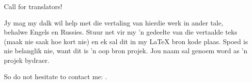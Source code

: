 \vspace*{\fill}

\Huge Call for translators!

\normalsize

\bigskip
\bigskip
\bigskip

Jy mag my dalk wil help met die vertaling van hierdie werk in ander
tale, behalwe Engels en Russies. Stuur net vir my 'n gedeelte van die
vertaalde teks (maak nie saak hoe kort nie) en ek sal dit in my LaTeX
bron kode plaas. Spoed is nie belanglik nie, want dit is 'n oop bron
projek. Jou naam sal genoem word as 'n projek bydraer.

So do not hesitate to contact me: \GTT{\EMAIL}.

\vspace*{\fill}
\vfill
